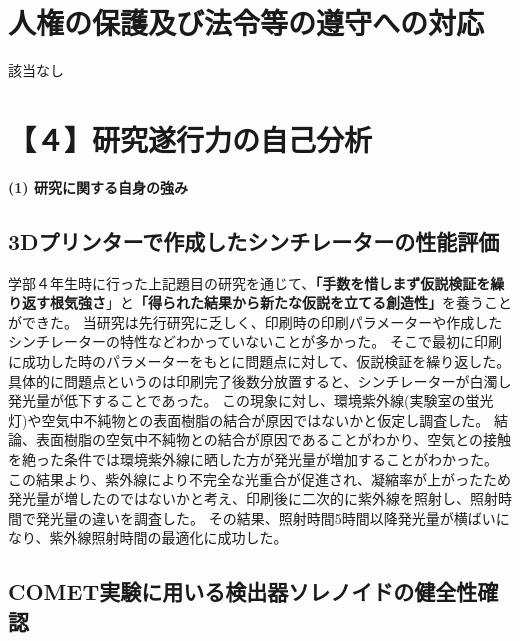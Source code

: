 \documentclass[11pt,a4j,dvipdfmx]{jarticle} 					%
\newcommand{\研究課題名}{COMET Phase-Iに向けたエンジニアリングランおよびその物理解析}
\newcommand{\研究機関名}{大阪大学}
\newcommand{\研究代表者氏名}{高見 翔太   }
\newcommand{\mysubsection}[1]{\vspace{-20pt}\subsection*{\colorbox{cyan!15}{\normalsize{#1}}}\vspace{-0.2cm}}
\begin{document}



\section{人権の保護及び法令等の遵守への対応}

該当なし
%




\section{【４】研究遂行力の自己分析}

\noindent
\textbf{(1) 研究に関する自身の強み}\\
\vspace{-0.5cm}
\mysubsection{3Dプリンターで作成したシンチレーターの性能評価}
学部４年生時に行った上記題目の研究を通じて、\textbf{「手数を惜しまず仮説検証を繰り返す根気強さ}」と\textbf{「得られた結果から新たな仮説を立てる創造性」}を養うことができた。
当研究は先行研究に乏しく、印刷時の印刷パラメーターや作成したシンチレーターの特性などわかっていないことが多かった。
そこで最初に印刷に成功した時のパラメーターをもとに問題点に対して、仮説検証を繰り返した。
具体的に問題点というのは印刷完了後数分放置すると、シンチレーターが白濁し発光量が低下することであった。
この現象に対し、環境紫外線(実験室の蛍光灯)や空気中不純物との表面樹脂の結合が原因ではないかと仮定し調査した。
結論、表面樹脂の空気中不純物との結合が原因であることがわかり、空気との接触を絶った条件では環境紫外線に晒した方が発光量が増加することがわかった。
この結果より、紫外線により不完全な光重合が促進され、凝縮率が上がったため発光量が増したのではないかと考え、印刷後に二次的に紫外線を照射し、照射時間で発光量の違いを調査した。
その結果、照射時間5時間以降発光量が横ばいになり、紫外線照射時間の最適化に成功した。
\mysubsection{COMET実験に用いる検出器ソレノイドの健全性確認}
\end{document}
